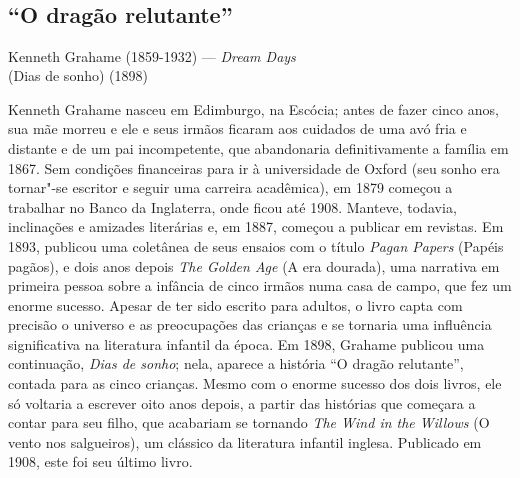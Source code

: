 \chapter*{\ }

\section{“O dragão relutante”} 

{\centering
Kenneth Grahame (1859-1932) --- \textit{Dream Days}\\ (Dias de sonho) (1898)
\par\smallskip}

Kenneth Grahame nasceu em Edimburgo, na Escócia; antes de fazer cinco
anos, sua mãe morreu e ele e seus irmãos ficaram aos cuidados de uma
avó fria e distante e de um pai incompetente, que abandonaria
definitivamente a família em 1867. Sem condições financeiras para ir
à universidade de Oxford (seu sonho era tornar"-se escritor e
seguir uma carreira acadêmica), em 1879 começou a trabalhar no Banco
da Inglaterra, onde ficou até 1908.
Manteve, todavia, inclinações e amizades literárias e, em
1887, começou a publicar em revistas. Em 1893, publicou uma
coletânea de seus ensaios com o título \textit{Pagan Papers} (Papéis pagãos), e dois anos
depois \textit{The Golden Age} (A era dourada), uma narrativa em primeira pessoa sobre a
infância de cinco irmãos numa casa de campo, que fez um enorme
sucesso. Apesar de ter sido escrito para adultos, o livro capta com
precisão o universo e as preocupações das crianças e se tornaria uma influência significativa
na literatura infantil da época. Em 1898, Grahame publicou uma
continuação, \textit{Dias de sonho}; nela, aparece a história “O dragão
relutante”, contada para as cinco crianças. Mesmo com o enorme sucesso 
dos dois livros, ele só voltaria a escrever oito anos
depois, a partir das histórias que começara a contar para seu filho,
que acabariam se tornando \textit{The Wind in the Willows} (O vento nos
salgueiros), um clássico da literatura infantil inglesa. Publicado em
1908, este foi seu último livro.

